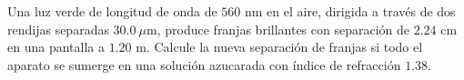 \item Una luz verde de longitud de onda de $560\text{ nm}$ en el aire, dirigida a través de dos rendijas separadas $30.0\ \mu\text{m}$, produce franjas brillantes con separación de $2.24\text{ cm}$ en una pantalla a $1.20\text{ m}$. Calcule la nueva separación de franjas si todo el aparato se sumerge en una solución azucarada con índice de refracción $1.38$.